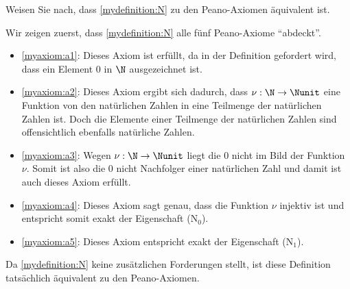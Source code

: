 \begin{myexercise}\label{myexercise:0105}
	Weisen Sie nach, dass \cref{mydefinition:N} zu den Peano-Axiomen äquivalent ist.
	\begin{myanswer}
		Wir zeigen zuerst, dass \cref{mydefinition:N} alle fünf Peano-Axiome \enquote{abdeckt}.
		\begin{itemize}
      \item \cref{myaxiom:a1}: Dieses Axiom ist erfüllt, da in der Definition gefordert wird, dass ein Element $0$ in $\N$ ausgezeichnet ist.
      \item \cref{myaxiom:a2}: Dieses Axiom ergibt sich dadurch, dass $\nu:\N\to\Nunit$ eine Funktion von den natürlichen Zahlen in eine Teilmenge der natürlichen Zahlen ist. Doch die Elemente einer Teilmenge der natürlichen Zahlen sind offensichtlich ebenfalls natürliche Zahlen.
			\item \cref{myaxiom:a3}: Wegen $\nu:\N\to\Nunit$ liegt die $0$ nicht im Bild der Funktion $\nu$.
			      Somit ist also die $0$ nicht Nachfolger einer natürlichen Zahl und damit ist auch dieses Axiom erfüllt.
			\item \cref{myaxiom:a4}: Dieses Axiom sagt genau, dass die Funktion $\nu$ injektiv ist und entspricht somit exakt der Eigenschaft (N$_0$).
			\item \cref{myaxiom:a5}: Dieses Axiom entspricht exakt der Eigenschaft (N$_1$).
		\end{itemize}
		Da \cref{mydefinition:N} keine zusätzlichen Forderungen stellt, ist diese Definition tatsächlich äquivalent zu den Peano-Axiomen.
	\end{myanswer}
\end{myexercise}

